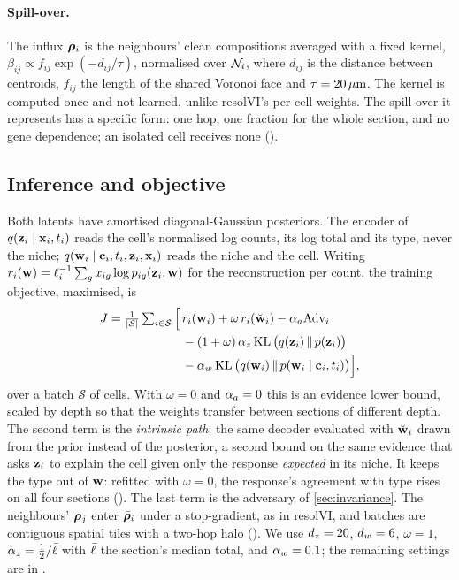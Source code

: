 \paragraph{Spill-over.}
The influx $\bar{\boldsymbol{\rho}}_i$ is the neighbours' clean compositions averaged with a fixed kernel, $\beta_{ij} \propto f_{ij}\exp(-d_{ij}/\tau)$, normalised over $\mathcal{N}_{i}$, where $d_{ij}$ is the distance between centroids, $f_{ij}$ the length of the shared Voronoi face and $\tau = 20\,\mu\text{m}$. The kernel is computed once and not learned, unlike resolVI's per-cell weights. The spill-over it represents has a specific form: one hop, one fraction for the whole section, and no gene dependence; an isolated cell receives none ().

\subsection{Inference and objective}
\label{sec:inference}
\label{sec:objective}
\label{sec:batching}

Both latents have amortised diagonal-Gaussian posteriors. The encoder of $q(\mathbf{z}_i \mid \mathbf{x}_i, t_i)$ reads the cell's normalised log counts, its log total and its type, never the niche; $q(\mathbf{w}_i \mid \mathbf{c}_i, t_i, \mathbf{z}_i, \mathbf{x}_i)$ reads the niche and the cell. Writing $r_i(\mathbf{w}) = \ell_i^{-1}\sum_g x_{ig}\log p_{ig}(\mathbf{z}_i, \mathbf{w})$ for the reconstruction per count, the training objective, maximised, is
\begin{equation}
\begin{split}
  J = \tfrac{1}{|\mathcal{S}|}\textstyle\sum_{i \in \mathcal{S}} \Big[\,& r_i(\mathbf{w}_i) + \omega\, r_i(\breve{\mathbf{w}}_i) - \alpha_a \mathrm{Adv}_i \\
  & - (1+\omega)\,\alpha_z \operatorname{KL}\big(q(\mathbf{z}_i) \,\|\, p(\mathbf{z}_i)\big) \\
  & - \alpha_w \operatorname{KL}\big(q(\mathbf{w}_i) \,\|\, p(\mathbf{w}_i \mid \mathbf{c}_i, t_i)\big) \Big],
\end{split}
\label{eq:objective}
\end{equation}
over a batch $\mathcal{S}$ of cells. With $\omega = 0$ and $\alpha_a = 0$ this is an evidence lower bound, scaled by depth so that the weights transfer between sections of different depth. The second term is the \emph{intrinsic path}: the same decoder evaluated with $\breve{\mathbf{w}}_i$ drawn from the prior instead of the posterior, a second bound on the same evidence \citep{slavutsky2025} that asks $\mathbf{z}_i$ to explain the cell given only the response \emph{expected} in its niche. It keeps the type out of $\mathbf{w}$: refitted with $\omega = 0$, the response's agreement with type rises on all four sections (). The last term is the adversary of \cref{sec:invariance}. The neighbours' $\boldsymbol{\rho}_j$ enter $\bar{\boldsymbol{\rho}}_i$ under a stop-gradient, as in resolVI, and batches are contiguous spatial tiles with a two-hop halo (). We use $d_z = 20$, $d_w = 6$, $\omega = 1$, $\alpha_z = \tfrac12/\bar{\ell}$ with $\bar{\ell}$ the section's median total, and $\alpha_w = 0.1$; the remaining settings are in .

